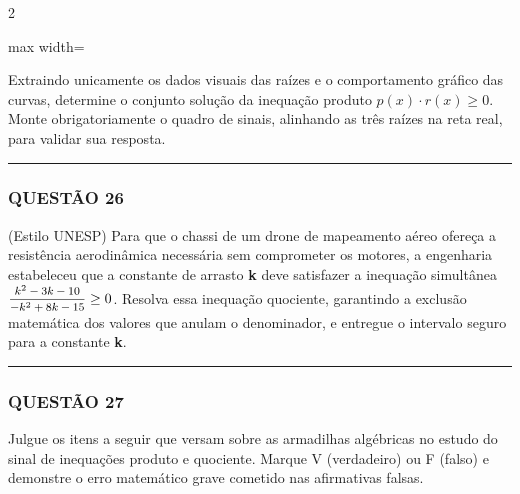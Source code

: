 \documentclass[11pt, a4paper]{article}
\begin{document}
\begin{multicols*}{2}
\begin{center}
\begin{adjustbox}{max width=\linewidth}
\end{adjustbox}
\end{center}

Extraindo unicamente os dados visuais das raízes e o comportamento gráfico das curvas, determine o conjunto solução da inequação produto $ p(x) \cdot r(x) \ge 0 $. Monte obrigatoriamente o quadro de sinais, alinhando as três raízes na reta real, para validar sua resposta.

\vspace{0cm} \noindent\textcolor{CorLinha}{\rule{\linewidth}{0.5pt}} \vspace{-0.2cm}
\subsubsection*{QUESTÃO 26}
(Estilo UNESP) Para que o chassi de um drone de mapeamento aéreo ofereça a resistência aerodinâmica necessária sem comprometer os motores, a engenharia estabeleceu que a constante de arrasto \textbf{k} deve satisfazer a inequação simultânea $ \mfrac{k^2 - 3k - 10}{-k^2 + 8k - 15} \ge 0 $. Resolva essa inequação quociente, garantindo a exclusão matemática dos valores que anulam o denominador, e entregue o intervalo seguro para a constante \textbf{k}.

\vspace{0cm} \noindent\textcolor{CorLinha}{\rule{\linewidth}{0.5pt}} \vspace{-0.2cm}
\subsubsection*{QUESTÃO 27}
Julgue os itens a seguir que versam sobre as armadilhas algébricas no estudo do sinal de inequações produto e quociente. Marque V (verdadeiro) ou F (falso) e demonstre o erro matemático grave cometido nas afirmativas falsas.


\end{multicols*}
\end{document}
